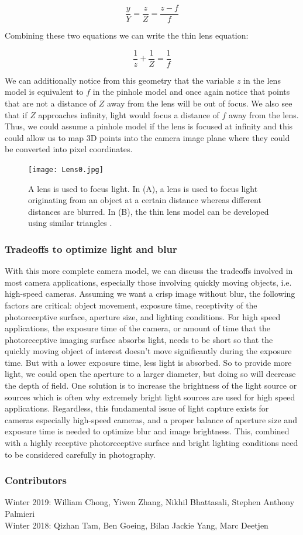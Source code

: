 $$\frac{y}{Y}=\frac{z}{Z}=\frac{z-f}{f}$$

Combining these two equations we can write the thin lens equation:

$$\frac{1}{z}+\frac{1}{Z}=\frac{1}{f}$$

We can additionally notice from this geometry that the variable $z$ in the lens model is equivalent to $f$ in the pinhole model and once again notice that points that are not a distance of $Z$ away from the lens will be out of focus. We also see that if $Z$ approaches infinity, light would focus a distance of $f$ away from the lens. Thus, we could assume a pinhole model if the lens is focused at infinity and this could allow us to map 3D points into the camera image plane where they could be converted into pixel coordinates.

\begin{figure}
\centering
\texttt{[image: Lens0.jpg]}
\caption{A lens is used to focus light. In (A), a lens is used to focus light originating from an object at a certain distance whereas different distances are blurred. In (B), the thin lens model can be developed using similar triangles  \cite{HZ}.}
\label{fig:Lens}
\end{figure}

\subsubsection{Tradeoffs to optimize light and blur}

With this more complete camera model, we can discuss the tradeoffs involved in most camera applications, especially those involving quickly moving objects, i.e. high-speed cameras. Assuming we want a crisp image without blur, the following factors are critical: object movement, exposure time, receptivity of the photoreceptive surface, aperture size, and lighting conditions. For high speed applications, the exposure time of the camera, or amount of time that the photoreceptive imaging surface absorbs light, needs to be short so that the quickly moving object of interest doesn't move significantly during the exposure time. But with a lower exposure time, less light is absorbed. So to provide more light, we could open the aperture to a larger diameter, but doing so will decrease the depth of field. One solution is to increase the brightness of the light source or sources which is often why extremely bright light sources are used for high speed applications. Regardless, this fundamental issue of light capture exists for cameras especially high-speed cameras, and a proper balance of aperture size and exposure time is needed to optimize blur and image brightness. This, combined with a highly receptive photoreceptive surface and bright lighting conditions need to be considered carefully in photography.



\subsubsection*{Contributors}
Winter 2019: William Chong, Yiwen Zhang, Nikhil Bhattasali, Stephen Anthony Palmieri
\\
Winter 2018: Qizhan Tam, Ben Goeing, Bilan Jackie Yang, Marc Deetjen


